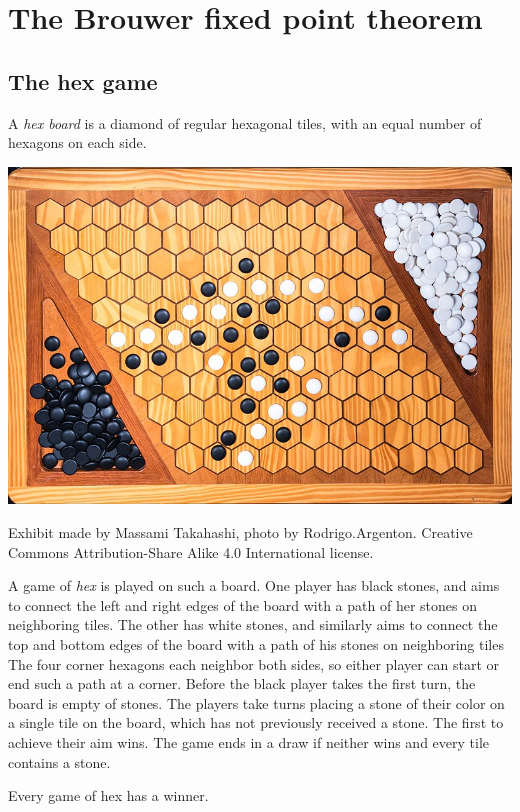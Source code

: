 \chapter{The Brouwer fixed point theorem}
\section{The hex game}
A \emph{hex board} is a diamond of regular hexagonal tiles, with an equal number of hexagons on each side.
\begin{center}
\tiny
\includegraphics[width=\textwidth]{hex-board}
\par\noindent{}Exhibit made by Massami Takahashi, photo by Rodrigo.Argenton.
Creative Commons Attribution-Share Alike 4.0 International license.
\end{center}
A game of \emph{hex} is played on such a board.
One player has black stones, and aims to connect the left and right edges of the board with a path of her stones on neighboring tiles.
The other has white stones, and similarly aims to connect the top and bottom edges of the board with a path of his stones on neighboring tiles
The four corner hexagons each neighbor both sides, so either player can start or end such a path at a corner.
Before the black player takes the first turn, the board is empty of stones.
The players take turns placing a stone of their color on a single tile on the board, which has not previously received a stone.
The first to achieve their aim wins.
The game ends in a draw if neither wins and every tile contains a stone.
\begin{theorem}\label{theorem:hex.has.a.winner}
Every game of hex has a winner.
\end{theorem}
